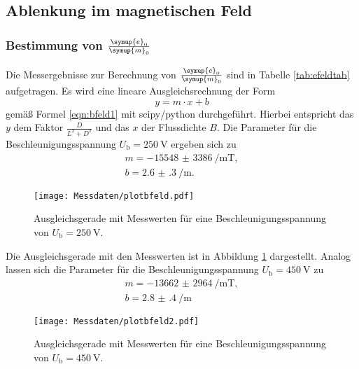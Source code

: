 
\FloatBarrier
\subsection{Ablenkung im magnetischen Feld}

\subsubsection{Bestimmung von $\frac{\symup{e}_0}{\symup{m}_0}$}
Die Messergebnisse zur Berechnung von $\frac{\symup{e}_0}{\symup{m}_0}$ sind in Tabelle
\ref{tab:efeldtab} aufgetragen. Es wird eine lineare Ausgleichsrechnung der Form
\begin{equation*}
	y = m \cdot x + b
\end{equation*}
gemäß Formel \eqref{eqn:bfeld1} mit scipy/python \cite{scipy} durchgeführt. Hierbei entspricht das
$y$ dem Faktor $\frac{D}{L^2+D^2}$ und das $x$ der Flussdichte $B$.
Die Parameter für die Beschleunigungsspannung $U_{\mathrm{b}}=\SI{250}{\volt}$ ergeben sich zu
\begin{gather*}
	m = -\SI{15548(3386)}{\per\meter\tesla} \mathrm{,} \\
	b = \SI{2.6(3)}{\per\meter} \mathrm{.}
\end{gather*}
\begin{figure}
  \centering
  \texttt{[image: Messdaten/plotbfeld.pdf]}
  \caption{Ausgleichsgerade mit Messwerten für eine Beschleunigungsspannung von $U_{\mathrm{b}}=\SI{250}{\volt}$.}
  \label{fig:bfeldplot}
\end{figure}
Die Ausgleichsgerade mit den Messwerten ist in Abbildung \ref{fig:bfeldplot} dargestellt.
Analog lassen sich die Parameter für die Beschleunigungsspannung $U_{\mathrm{b}}=\SI{450}{\volt}$
zu
\begin{gather*}
	m = -\SI{13662(2964)}{\per\meter\tesla} \mathrm{,} \\
	b = \SI{2.8(4)}{\per\meter}
\end{gather*}
\begin{figure}
  \centering
  \texttt{[image: Messdaten/plotbfeld2.pdf]}
  \caption{Ausgleichsgerade mit Messwerten für eine Beschleunigungsspannung von $U_{\mathrm{b}}=\SI{450}{\volt}$.}
  \label{fig:bfeldplot2}
\end{figure}
